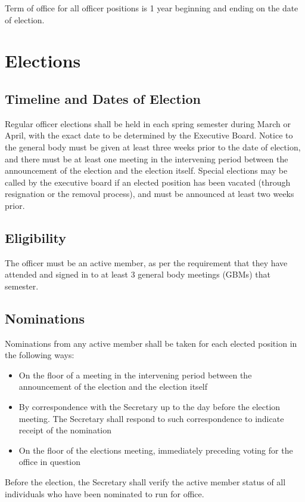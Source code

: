 \documentclass{article}
\begin{document}
Term of office for all officer positions is 1 year beginning and ending on the date of election.

\section{Elections}
\subsection{Timeline and Dates of Election}
Regular officer elections shall be held in each spring semester during March or April, with the exact date to be determined by the Executive Board. Notice to the general body must be given at least three weeks prior to the date of election, and there must be at least one meeting in the intervening period between the announcement of the election and the election itself. Special elections may be called by the executive board if an elected position has been vacated (through resignation or the removal process), and must be announced at least two weeks prior.

\subsection{Eligibility}
The officer must be an active member, as per the requirement that they have attended and signed in to at least 3 general body meetings (GBMs) that semester. 

\subsection{Nominations}
Nominations from any active member shall be taken for each elected position in the following ways:

\begin{itemize}
    \item On the floor of a meeting in the intervening period between the announcement of the election and the election itself
    \item By correspondence with the Secretary up to the day before the election meeting. The Secretary shall respond to such correspondence to indicate receipt of the nomination
    \item On the floor of the elections meeting, immediately preceding voting for the office in question

\end{itemize}

Before the election, the Secretary shall verify the active member status of all individuals who have been nominated to run for office.
\end{document}
